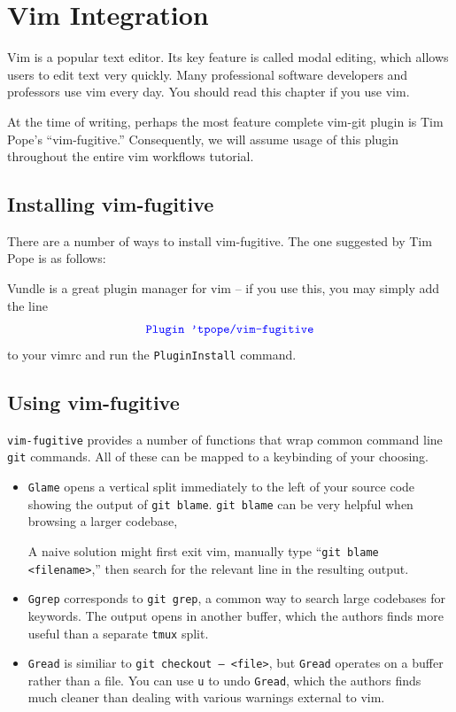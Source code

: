 \documentclass[12pt]{report}
\newcommand\code[1]{{\color{blue}\texttt{#1}}}
\begin{document}
\chapter{Vim Integration}

Vim is a popular text editor. Its key feature is called modal editing, which allows users to edit text very quickly. Many professional software developers and professors use vim every day. You should read this chapter if you use vim.

At the time of writing, perhaps the most feature complete vim-git
plugin is Tim Pope’s “vim-fugitive.” Consequently, we will assume
usage of this plugin throughout the entire vim workflows tutorial.

\section{Installing vim-fugitive}

There are a number of ways to install vim-fugitive. The one suggested
by Tim Pope is as follows:
Vundle is a great plugin manager for vim -- if you use this, you may
simply add the line
\[
  \code{Plugin 'tpope/vim-fugitive}
\]
to your vimrc and run the \code{PluginInstall} command.

\section{Using vim-fugitive}

\texttt{vim-fugitive} provides a number of functions that wrap common
command line \texttt{git} commands. All of these can be mapped to a
keybinding of your choosing.

\begin{itemize}
\item \code{Glame} opens a vertical split immediately to the left of
  your source code showing the output of \code{git blame}. \code{git
    blame} can be very helpful when browsing a larger codebase,

  A naive solution might first exit vim, manually type “\code{git
    blame <filename>},” then search for the relevant line in the
  resulting output.

\item \code{Ggrep} corresponds to \code{git grep}, a common way to
  search large codebases for keywords. The output opens in another
  buffer, which the authors finds more useful than a separate
  \texttt{tmux} split.

\item \code{Gread} is similiar to \code{git checkout -- <file>}, but
  \code{Gread} operates on a buffer rather than a file. You can use
  \code{u} to undo \code{Gread}, which the authors finds much cleaner
  than dealing with various warnings external to vim.
\end{itemize}
\end{document}
